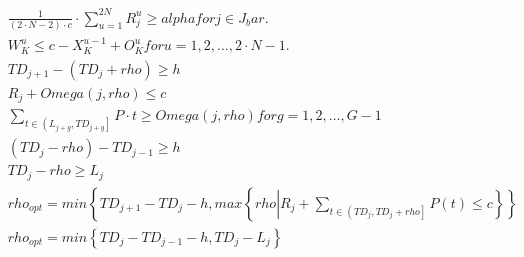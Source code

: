 \begin{align}
  & \frac{1}{\left(2 \cdot N - 2\right) \cdot c} \cdot \sum_{u = 1}^{2 N} R_{j}^{u} \geq \mathit{alpha} for j \in J_bar . \tag{eq\_0033} \\
  & W_{K}^{u} \leq c - X_{K}^{u - 1} + O_{K}^{u} for u = 1 , 2 , \ldots , 2 \cdot N - 1 . \tag{eq\_0034} \\
  & \mathit{TD}_{j + 1} - \left(\mathit{TD}_{j} + \mathit{rho}\right) \geq h \tag{eq\_0037} \\
  & R_{j} + \mathit{Omega} \left(j , \mathit{rho}\right) \leq c \tag{eq\_0038} \\
  & \sum_{t \in \left(L_{j + g} , \mathit{TD}_{j + g}\right]} P \cdot t \geq \mathit{Omega} \left(j , \mathit{rho}\right) for g = 1 , 2 , \hdots , G - 1 \tag{eq\_0039} \\
  & \left(\mathit{TD}_{j} - \mathit{rho}\right) - \mathit{TD}_{j - 1} \geq h \tag{eq\_0040} \\
  & \mathit{TD}_{j} - \mathit{rho} \geq L_{j} \tag{eq\_0041} \\
  & \mathit{rho}_{\mathit{opt}} = min \left\{\right. \mathit{TD}_{j + 1} - \mathit{TD}_{j} - h , max \left\{\right. \mathit{rho} \left|\right. R_{j} + \sum_{t \in \left(\mathit{TD}_{j} , \mathit{TD}_{j} + \mathit{rho}\right]} P \left(t\right) \leq c \left.\right\} \left.\right\} \tag{eq\_0042} \\
  & \mathit{rho}_{\mathit{opt}} = min \left\{\mathit{TD}_{j} - \mathit{TD}_{j - 1} - h , \mathit{TD}_{j} - L_{j}\right\} \tag{eq\_0043} \\
\end{align}
